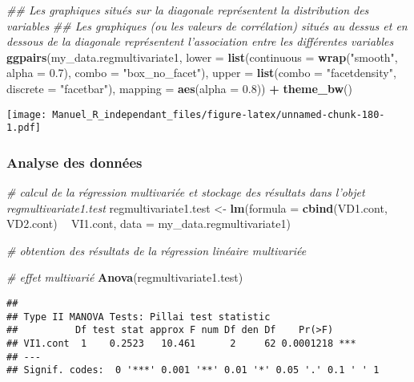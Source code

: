 \documentclass[
]{book}
\newenvironment{Shaded}{\begin{snugshade}}{\end{snugshade}}
\newcommand{\CommentTok}[1]{\textcolor[rgb]{0.56,0.35,0.01}{\textit{#1}}}
\newcommand{\DataTypeTok}[1]{\textcolor[rgb]{0.13,0.29,0.53}{#1}}
\newcommand{\FloatTok}[1]{\textcolor[rgb]{0.00,0.00,0.81}{#1}}
\newcommand{\KeywordTok}[1]{\textcolor[rgb]{0.13,0.29,0.53}{\textbf{#1}}}
\newcommand{\NormalTok}[1]{#1}
\newcommand{\OperatorTok}[1]{\textcolor[rgb]{0.81,0.36,0.00}{\textbf{#1}}}
\newcommand{\StringTok}[1]{\textcolor[rgb]{0.31,0.60,0.02}{#1}}
\begin{document}
\begin{Shaded}
\begin{Highlighting}[]
\CommentTok{## Les graphiques situés sur la diagonale représentent la distribution des variables}
\CommentTok{## Les graphiques (ou les valeurs de corrélation) situés au dessus et en dessous de la diagonale représentent l'association entre les différentes variables}
\KeywordTok{ggpairs}\NormalTok{(my_data.regmultivariate1,}
        \DataTypeTok{lower =} \KeywordTok{list}\NormalTok{(}\DataTypeTok{continuous =} \KeywordTok{wrap}\NormalTok{(}\StringTok{"smooth"}\NormalTok{, }\DataTypeTok{alpha =} \FloatTok{0.7}\NormalTok{), }\DataTypeTok{combo =} \StringTok{"box_no_facet"}\NormalTok{),}
        \DataTypeTok{upper =} \KeywordTok{list}\NormalTok{(}\DataTypeTok{combo =} \StringTok{"facetdensity"}\NormalTok{, }\DataTypeTok{discrete =} \StringTok{"facetbar"}\NormalTok{), }
        \DataTypeTok{mapping =} \KeywordTok{aes}\NormalTok{(}\DataTypeTok{alpha =} \FloatTok{0.8}\NormalTok{)) }\OperatorTok{+}\StringTok{ }\KeywordTok{theme_bw}\NormalTok{()}
\end{Highlighting}
\end{Shaded}

\texttt{[image: Manuel\_R\_independant\_files/figure-latex/unnamed-chunk-180-1.pdf]}

\hypertarget{analyse-des-donnuxe9es-21}{%
\subsubsection{Analyse des données}\label{analyse-des-donnuxe9es-21}}

\begin{Shaded}
\begin{Highlighting}[]
\CommentTok{# calcul de la régression multivariée et stockage des résultats dans l’objet regmultivariate1.test}
\NormalTok{regmultivariate1.test <-}\StringTok{ }\KeywordTok{lm}\NormalTok{(}\DataTypeTok{formula =} \KeywordTok{cbind}\NormalTok{(VD1.cont, VD2.cont) }\OperatorTok{~}\StringTok{ }\NormalTok{VI1.cont,}
                    \DataTypeTok{data =}\NormalTok{ my_data.regmultivariate1)}

\CommentTok{# obtention des résultats de la régression linéaire multivariée}

\CommentTok{# effet multivarié}
\KeywordTok{Anova}\NormalTok{(regmultivariate1.test)}
\end{Highlighting}
\end{Shaded}

\begin{verbatim}
## 
## Type II MANOVA Tests: Pillai test statistic
##          Df test stat approx F num Df den Df    Pr(>F)    
## VI1.cont  1    0.2523   10.461      2     62 0.0001218 ***
## ---
## Signif. codes:  0 '***' 0.001 '**' 0.01 '*' 0.05 '.' 0.1 ' ' 1
\end{verbatim}
\end{document}
